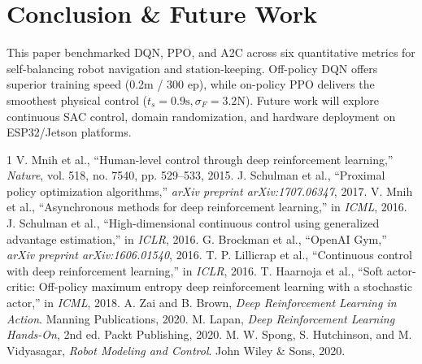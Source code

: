 \documentclass[journal,twocolumn]{IEEEtran}
\begin{document}
\section{Conclusion \& Future Work}
This paper benchmarked DQN, PPO, and A2C across six quantitative metrics for self-balancing robot navigation and station-keeping. Off-policy DQN offers superior training speed (0.2m / 300 ep), while on-policy PPO delivers the smoothest physical control ($t_s = 0.9\text{s}, \sigma_F = 3.2\text{N}$). Future work will explore continuous SAC control, domain randomization, and hardware deployment on ESP32/Jetson platforms.

\begin{thebibliography}{1}
 V. Mnih et al., ``Human-level control through deep reinforcement learning,'' \emph{Nature}, vol. 518, no. 7540, pp. 529--533, 2015.
 J. Schulman et al., ``Proximal policy optimization algorithms,'' \emph{arXiv preprint arXiv:1707.06347}, 2017.
 V. Mnih et al., ``Asynchronous methods for deep reinforcement learning,'' in \emph{ICML}, 2016.
 J. Schulman et al., ``High-dimensional continuous control using generalized advantage estimation,'' in \emph{ICLR}, 2016.
 G. Brockman et al., ``OpenAI Gym,'' \emph{arXiv preprint arXiv:1606.01540}, 2016.
 T. P. Lillicrap et al., ``Continuous control with deep reinforcement learning,'' in \emph{ICLR}, 2016.
 T. Haarnoja et al., ``Soft actor-critic: Off-policy maximum entropy deep reinforcement learning with a stochastic actor,'' in \emph{ICML}, 2018.
 A. Zai and B. Brown, \emph{Deep Reinforcement Learning in Action}. Manning Publications, 2020.
 M. Lapan, \emph{Deep Reinforcement Learning Hands-On}, 2nd ed. Packt Publishing, 2020.
 M. W. Spong, S. Hutchinson, and M. Vidyasagar, \emph{Robot Modeling and Control}. John Wiley \& Sons, 2020.
\end{thebibliography}
\end{document}
